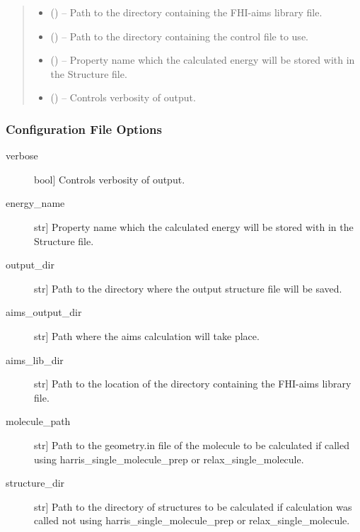 \documentclass[letterpaper,10pt,english]{sphinxmanual}
\begin{document}
\begin{fulllineitems}
\begin{quote}
\begin{description}
\begin{itemize}
\item {} 
 () -- Path to the directory containing the FHI-aims library file.

\item {} 
 () -- Path to the directory containing the control file to use.

\item {} 
 () -- Property name which the calculated energy will be stored with in the
Structure file.

\item {} 
 () -- Controls verbosity of output.

\end{itemize}

\end{description}\end{quote}
\subsubsection*{Configuration File Options}
\begin{description}
\item[{verbose}] \leavevmode{[}bool{]}
Controls verbosity of output.

\item[{energy\_name}] \leavevmode{[}str{]}
Property name which the calculated energy will be stored with in the
Structure file.

\item[{output\_dir}] \leavevmode{[}str{]}
Path to the directory where the output structure file will be saved.

\item[{aims\_output\_dir}] \leavevmode{[}str{]}
Path where the aims calculation will take place.

\item[{aims\_lib\_dir}] \leavevmode{[}str{]}
Path to the location of the directory containing the FHI-aims library
file.

\item[{molecule\_path}] \leavevmode{[}str{]}
Path to the geometry.in file of the molecule to be calculated if
called using harris\_single\_molecule\_prep or relax\_single\_molecule.

\item[{structure\_dir}] \leavevmode{[}str{]}
Path to the directory of structures to be calculated if calculation
was called not using harris\_single\_molecule\_prep or
relax\_single\_molecule.


\end{description}
\end{fulllineitems}
\end{document}
